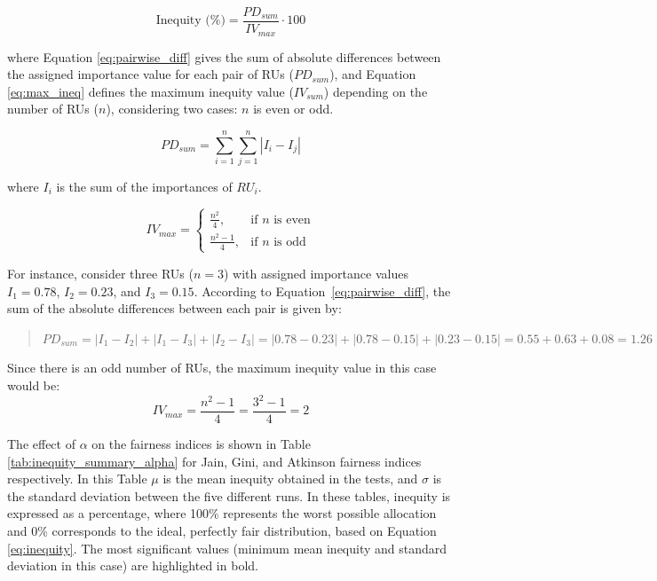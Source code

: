 \documentclass[preprint,12pt]{elsarticle}
\begin{document}
\begin{equation}
\text{Inequity (\%)} = \frac{PD_{sum}}{IV_{max}} \cdot 100
\label{eq:inequity}
\end{equation}

where Equation \ref{eq:pairwise_diff} gives the sum of absolute differences between the assigned importance value for each pair of RUs ($PD_{sum}$), and Equation \ref{eq:max_ineq} defines the maximum inequity value ($IV_{sum}$) depending on the number of RUs (\(n\)), considering two cases: \(n\) is even or odd. 

\begin{equation}
PD_{sum} = \sum_{i=1}^{n} \sum_{j=1}^{n} \left| I_i - I_j \right|
\label{eq:pairwise_diff}
\end{equation}

where $I_i$ is the sum of the importances of $RU_i$.

\begin{equation}
IV_{max} =
\begin{cases}
\frac{n^2}{4}, & \text{if } n \text{ is even}\\[8pt]
\frac{n^2-1}{4}, & \text{if } n \text{ is odd}
\end{cases}
\label{eq:max_ineq}
\end{equation}

For instance, consider three RUs ($n=3$) with assigned importance values $I_1=0.78$, $I_2=0.23$, and $I_3=0.15$. According to Equation~\ref{eq:pairwise_diff}, the sum of the absolute differences between each pair is given by:
\begin{quote}
    $PD_{sum} = |I_1 - I_2| + |I_1 - I_3| + |I_2 - I_3| = |0.78 - 0.23| + |0.78 - 0.15| + |0.23 - 0.15| = 0.55 + 0.63 + 0.08 = 1.26$
\end{quote}

Since there is an odd number of RUs, the maximum inequity value in this case would be: 
$$ IV_{max} = \frac{n^{2} - 1}{4} = \frac{3^2 - 1}{4} = 2 $$

The effect of $\alpha$ on the fairness indices is shown in Table \ref{tab:inequity_summary_alpha} for Jain, Gini, and Atkinson fairness indices respectively. In this Table $\mu$ is the mean inequity obtained in the tests, and $\sigma$ is the standard deviation between the five different runs. In these tables, inequity is expressed as a percentage, where 100\% represents the worst possible allocation and 0\% corresponds to the ideal, perfectly fair distribution, based on Equation \ref{eq:inequity}. The most significant values (minimum mean inequity and standard deviation in this case) are highlighted in bold.
\end{document}
